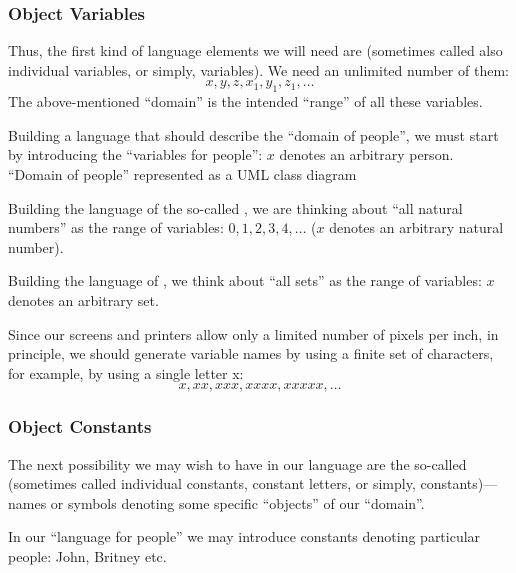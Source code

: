 \subsubsection*{Object Variables}

Thus, the first kind of language elements we will need are  (sometimes called also individual variables, or simply, variables).
We need an unlimited number of them:
\[
x, y, z, x_1, y_1, z_1, \ldots
\]
The above-mentioned ``domain'' is the intended ``range'' of all these variables.

\begin{example}
Building a language that should describe the ``domain of people'', we must start by introducing the ``variables for people'': \(x\) denotes an arbitrary person.
``Domain of people'' represented as a UML class diagram
\end{example}

\begin{example}
Building the language of the so-called , we are thinking about ``all natural numbers'' as the range of variables: \(0, 1, 2, 3, 4, \ldots\) (\(x\) denotes an arbitrary natural number).
\end{example}

\begin{example}
Building the language of , we think about ``all sets'' as the range of variables: \(x\) denotes an arbitrary set.
\end{example}

\begin{note}
Since our screens and printers allow only a limited number of pixels per inch, in principle, we
should generate variable names by using a finite set of characters, for example, by using a single letter x:
\[
x, xx, xxx, xxxx, xxxxx, \ldots
\]
\end{note}

\subsubsection*{Object Constants}

The next possibility we may wish to have in our language are the so-called  (sometimes called individual constants, constant letters, or simply, constants)---names or symbols denoting some specific ``objects'' of our ``domain''.

\begin{example}
In our ``language for people'' we may introduce constants denoting particular people: John, Britney etc.
\end{example}

